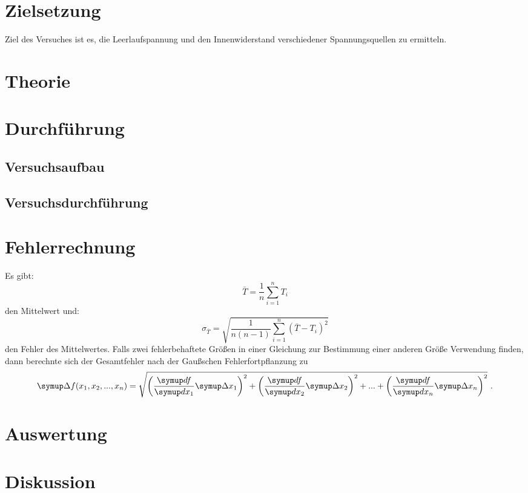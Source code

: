 \maketitle
\tableofcontents
\newpage

\section{Zielsetzung}
Ziel des Versuches ist es, die Leerlaufspannung und den Innenwiderstand verschiedener
Spannungsquellen zu ermitteln.
\section{Theorie}

\section{Durchführung}
\subsection{Versuchsaufbau}

\subsection{Versuchsdurchführung}

 \section{Fehlerrechnung}
 Es gibt:
 \begin{equation}
   \bar{T} = \frac{1}{n} \sum_{i=1}^{n} T_{i}
   \label{eqn:1}
 \end{equation}
 den Mittelwert und:
 \begin{equation}
   \sigma_{\bar{T}} = \sqrt{\frac{1}{n(n-1)} \sum_{i=1}^{n}(\bar{T}-T_i)^2}
   \label{eqn:2}
 \end{equation}
 den Fehler des Mittelwertes. Falls zwei fehlerbehaftete Größen in einer Gleichung
 zur Bestimmung einer anderen Größe Verwendung finden, dann berechnte sich der Gesamtfehler
 nach der Gaußschen Fehlerfortpflanzung zu
 \begin{equation}
     \symup \Delta f(x_1, x_2, ..., x_n) = \sqrt{\left(\frac{\symup df}{\symup dx_1} \symup \Delta
     x_1 \right)^2 +    \left(\frac{\symup df}{\symup dx_2} \symup \Delta
     x_2 \right)^2 + ... + \left(\frac{\symup df}{\symup dx_n} \symup \Delta x_n \right)^2} \ .
     \label{eqn:3}
 \end{equation}

\section{Auswertung}

\section{Diskussion}

\newpage
\nocite{*}
\printbibliography
